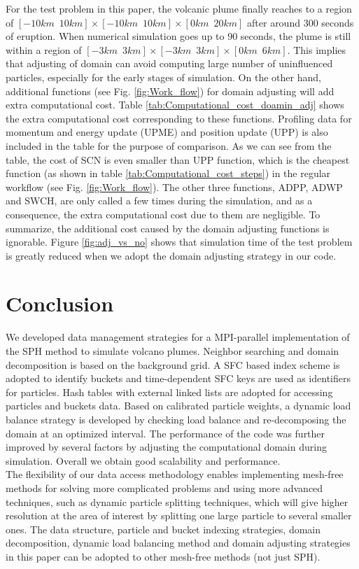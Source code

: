 \documentclass[procedia]{easychair}
\begin{document}
For the test problem in this paper, the volcanic plume finally reaches to a region of $[-10km \,\,\, 10km] \times [-10km\,\,\,10km] \times [0km\,\,\,20km]$ after around 300 seconds of eruption. When numerical simulation goes up to 90 seconds, the plume is still within a region of $[-3km\,\,\,3km] \times [-3km\,\,\,3km] \times [0km\,\,\,6km]$. This implies that adjusting of domain can avoid computing large number of uninfluenced particles, especially for the early stages of simulation. On the other hand, additional functions (see Fig. \ref{fig:Work_flow}) for domain adjusting will add extra computational cost. Table \ref{tab:Computational_cost_doamin_adj} shows the extra computational cost corresponding to these functions. Profiling data for momentum and energy update (UPME) and position update (UPP) is also included in the table for the purpose of comparison. As we can see from the table, the cost of SCN is even smaller than UPP function, which is the cheapest function (as shown in table \ref{tab:Computational_cost_steps}) in the regular workflow (see Fig. \ref{fig:Work_flow}). The other three functions, ADPP, ADWP and SWCH, are only called a few times during the simulation, and as a consequence, the extra computational cost due to them are negligible. To summarize, the additional cost caused by the domain adjusting functions is ignorable.
Figure \ref{fig:adj_vs_no} shows that simulation time of the test problem is greatly reduced when we adopt the domain adjusting strategy in our code.
\section{Conclusion}
We developed data management strategies for a MPI-parallel implementation of the  SPH method to simulate volcano plumes. Neighbor searching and domain decomposition is based on the background grid. A SFC based index scheme is adopted to identify buckets and time-dependent SFC keys are used as identifiers for particles. 
Hash tables with external linked lists are adopted for accessing particles and buckets data. Based on calibrated particle weights, a dynamic load balance strategy is developed by checking load balance and re-decomposing the domain at an optimized interval. The performance of the code was further improved by several factors by adjusting the computational domain during simulation. 
Overall we obtain good scalability and performance.\\
The flexibility of our data access methodology enables implementing mesh-free methods for solving more complicated problems and using more advanced techniques, such as dynamic particle splitting techniques\cite{vacondio2012accurate, feldman2007dynamic}, which will give higher resolution at the area of interest by splitting one large particle to several smaller ones. The data structure, particle and bucket indexing strategies, domain decomposition, dynamic load balancing method and domain adjusting strategies in this paper can be adopted to other mesh-free methods (not just SPH).
%
\label{sect:bib}

%
%
%

\end{document}
